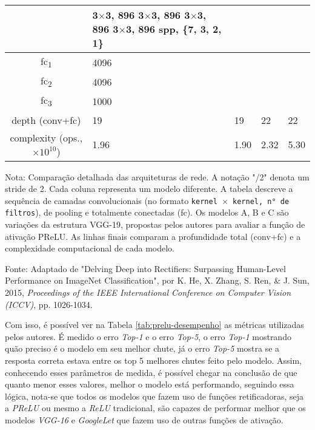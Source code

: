 \begin{table}
\begin{threeparttable}
\begin{tabular}{cllll}
              & \makecell[l]{3$\times$3, 896 \\ 3$\times$3, 896 \\ 3$\times$3, 896 \\ 3$\times$3, 896 \\ \addlinespace spp, \{7, 3, 2, 1\}} \\
            \midrule
            fc\textsubscript{1} & \multicolumn{4}{l}{4096} \\
            fc\textsubscript{2} & \multicolumn{4}{l}{4096} \\
            fc\textsubscript{3} & \multicolumn{4}{l}{1000} \\
            \midrule
            depth (conv+fc) & 19 & 19 & 22 & 22 \\
            complexity (ops., $\times 10^{10}$) & 1.96 & 1.90 & 2.32 & 5.30 \\
            \bottomrule
        \end{tabular}
        
        \begin{tablenotes}[para]
            \small
            \item[] Nota: Comparação detalhada das arquiteturas de rede. A notação "/2" denota um stride de 2. Cada coluna representa um modelo diferente. A tabela descreve a sequência de camadas convolucionais (no formato \texttt{kernel $\times$ kernel, n° de filtros}), de pooling e totalmente conectadas (fc). Os modelos A, B e C são variações da estrutura VGG-19, propostas pelos autores para avaliar a função de ativação PReLU. As linhas finais comparam a profundidade total (conv+fc) e a complexidade computacional de cada modelo.
            \item[] Fonte: Adaptado de "Delving Deep into Rectifiers: Surpassing Human-Level Performance on ImageNet Classification", por K. He, X. Zhang, S. Ren, \& J. Sun, 2015, \textit{Proceedings of the IEEE International Conference on Computer Vision (ICCV)}, pp. 1026-1034.
        \end{tablenotes}
        
    \end{threeparttable}
\end{table}

 Com isso, é possível ver na Tabela \ref{tab:prelu-desempenho} as métricas utilizadas pelos autores. É medido o erro \textit{Top-1} e o erro \textit{Top-5}, o erro \textit{Top-1} mostrando quão preciso é o modelo em seu melhor chute, já o erro \textit{Top-5} mostra se a resposta correta estava entre os top 5 melhores chutes feito pelo modelo. Assim, conhecendo esses parâmetros de medida, é possível chegar na conclusão de que quanto menor esses valores, melhor o modelo está performando, seguindo essa lógica, nota-se que todos os modelos que fazem uso de funções retificadoras, seja a \textit{PReLU} ou mesmo a \textit{ReLU} tradicional, são capazes de performar melhor que os modelos \textit{VGG-16} e \textit{GoogleLet} que fazem uso de outras funções de ativação.


